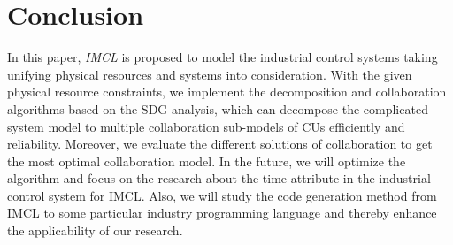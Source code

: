 \section{Conclusion}
In this paper, \emph{IMCL} is proposed to model the industrial control systems taking unifying physical resources and systems into consideration.
With the given physical resource constraints, we implement the decomposition and collaboration algorithms based on the SDG analysis, which can decompose the complicated system model to multiple collaboration sub-models of CUs efficiently and reliability.
Moreover, we evaluate the different solutions of collaboration to get the most optimal collaboration model.
In the future,  we will optimize the algorithm and focus on the research about the time attribute in the industrial control system for IMCL. Also, we will study the code generation method from IMCL to some particular industry programming language and thereby enhance the applicability of our research.


